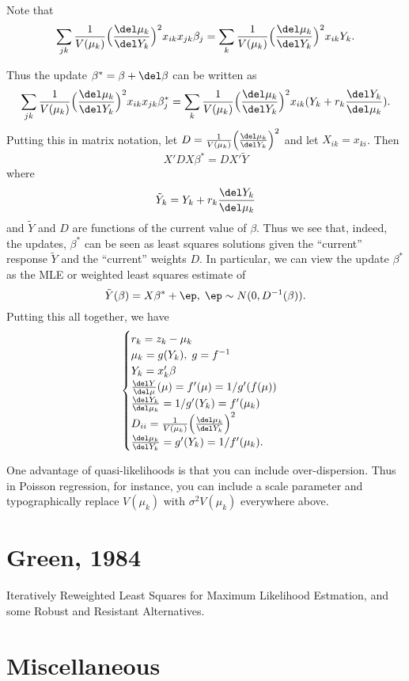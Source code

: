 \documentclass{article}
\newcommand{\graddel}[2]{\frac{\del #1}{\del #2}}
\begin{document}
Note that 
\[
\sum_{jk} \frac{1}{V(\mu_k)} \Big(\graddel{\mu_k}{Y_k}\Big)^2 x_{ik} x_{jk}
\beta_j = 
\sum_{k} \frac{1}{V(\mu_k)} \Big(\graddel{\mu_k}{Y_k}\Big)^2 x_{ik} Y_k.
\]

Thus the update $\beta^* = \beta + \del \beta$ can be written as
\[
\sum_{jk} \frac{1}{V(\mu_k)} \Big(\graddel{\mu_k}{Y_k}\Big)^2 x_{ik} x_{jk} 
\beta_j^*
=
\sum_{k} \frac{1}{V(\mu_k)}\Big(\graddel{\mu_k}{Y_k} \Big)^2  x_{ik} (Y_k + r_{k} 
\frac{\del Y_k}{\del \mu_k}).
\]
Putting this in matrix notation, let $D =
\frac{1}{V(\mu_k)}\Big(\graddel{\mu_k}{Y_k} \Big)^2$ and let $X_{ik} = x_{ki}$.
Then
\[
X' D X \beta^* = D X' \tilde Y
\]
where
\[
\tilde Y_k = Y_k + r_k \graddel{Y_k}{\mu_k}
\]
and $\tilde Y$ and $D$ are functions of the current value of $\beta$.  Thus we
see that, indeed, the updates, $\beta^*$ can be seen as least squares solutions
given the ``current'' response $\tilde Y$ and the ``current'' weights $D$.  In
particular, we can view the update $\beta^*$ as the MLE or weighted least
squares estimate of
\[
\tilde Y(\beta) = X \beta^* + \ep, \; \ep \sim N(0, D^{-1}(\beta)).
\]
Putting this all together, we have
\[
\begin{cases}
  r_k = z_k - \mu_k \\
  \mu_k = g(Y_k), \; g = f^{-1} \\
  Y_k = x_k' \beta \\
  \graddel{Y}{\mu}(\mu) = f'(\mu) = 1/g'(f(\mu)) \\
  \graddel{Y_k}{\mu_k} = 1/g'(Y_k) = f'(\mu_k) \\
  D_{ii} = \frac{1}{V(\mu_k)}\Big(\graddel{\mu_k}{Y_k} \Big)^2 \\
  \graddel{\mu_k}{Y_k} = g'(Y_k) = 1/f'(\mu_k).
\end{cases}
\]

One advantage of quasi-likelihoods is that you can include over-dispersion.
Thus in Poisson regression, for instance, you can include a scale parameter and
typographically replace $V(\mu_k)$ with $\sigma^2 V(\mu_k)$ everywhere above.

\section{Green, 1984}

Iteratively Reweighted Least Squares for Maximum Likelihood Estmation, and some
Robust and Resistant Alternatives.


\section{Miscellaneous}
\end{document}
